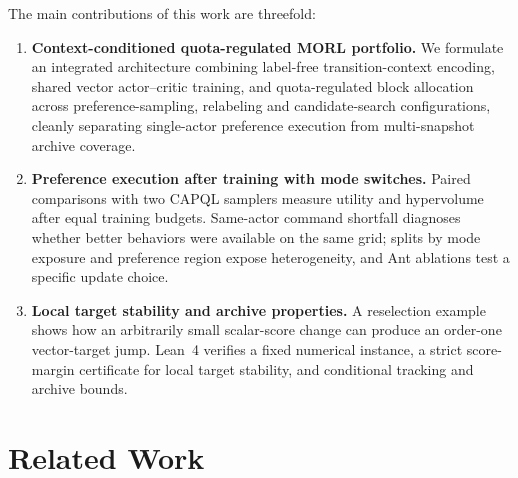 \documentclass[10pt]{article}
\begin{document}
The main contributions of this work are threefold:
\begin{enumerate}
    \item \textbf{Context-conditioned quota-regulated MORL portfolio.} We formulate an integrated architecture combining label-free transition-context encoding, shared vector actor--critic training, and quota-regulated block allocation across preference-sampling, relabeling and candidate-search configurations, cleanly separating single-actor preference execution from multi-snapshot archive coverage.
    \item \textbf{Preference execution after training with mode switches.} Paired comparisons with two CAPQL samplers measure utility and hypervolume after equal training budgets. Same-actor command shortfall diagnoses whether better behaviors were available on the same grid; splits by mode exposure and preference region expose heterogeneity, and Ant ablations test a specific update choice.
    \item \textbf{Local target stability and archive properties.} A reselection example shows how an arbitrarily small scalar-score change can produce an order-one vector-target jump. Lean~4 verifies a fixed numerical instance, a strict score-margin certificate for local target stability, and conditional tracking and archive bounds.
\end{enumerate}

\section{Related Work}
\end{document}

